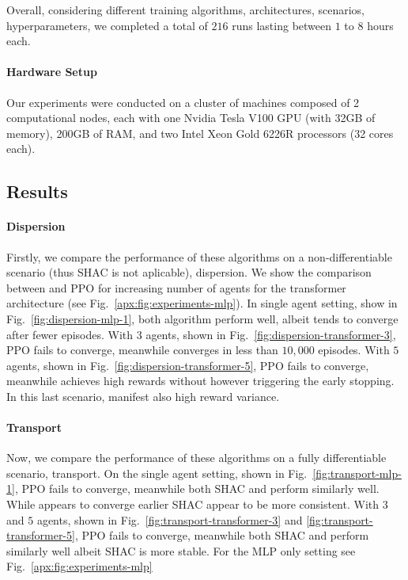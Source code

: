 Overall, considering different training algorithms, architectures, scenarios, hyperparameters, we completed a total of $216$ runs lasting between $1$ to $8$ hours each. 

\paragraph{Hardware Setup}
Our experiments were conducted on a cluster of machines composed of 2 computational nodes, each with one Nvidia Tesla V100 GPU (with 32GB of memory), 200GB of RAM, and two Intel Xeon Gold 6226R processors (32 cores each).

\subsection{Results}

\paragraph{Dispersion}
Firstly, we compare the performance of these algorithms on a non-differentiable scenario (thus SHAC is not aplicable), dispersion. We show the comparison between \fname{} and PPO for increasing number of agents for the transformer architecture (see Fig.~\ref{apx:fig:experiments-mlp}). In single agent setting, show in Fig.~\ref{fig:dispersion-mlp-1}, both algorithm perform well, albeit \fname{} tends to converge after fewer episodes. With $3$ agents, shown in Fig.~\ref{fig:dispersion-transformer-3}, PPO fails to converge, meanwhile \fname{} converges in less than $10,000$ episodes. With $5$ agents, shown in Fig.~\ref{fig:dispersion-transformer-5}, PPO fails to converge, meanwhile \fname{} achieves high rewards without however triggering the early stopping. In this last scenario, \fname{} manifest also high reward variance.

\paragraph{Transport}
Now, we compare the performance of these algorithms on a fully differentiable scenario, transport. On the single agent setting, shown in Fig.~\ref{fig:transport-mlp-1}, PPO fails to converge, meanwhile both SHAC and \fname{} perform similarly well. While \fname{} appears to converge earlier SHAC appear to be more consistent. With $3$ and $5$ agents, shown in Fig.~\ref{fig:transport-transformer-3} and \ref{fig:transport-transformer-5}, PPO fails to converge, meanwhile both SHAC and \fname{} perform similarly well albeit SHAC is more stable. For the MLP only setting see Fig.~\ref{apx:fig:experiments-mlp} 

